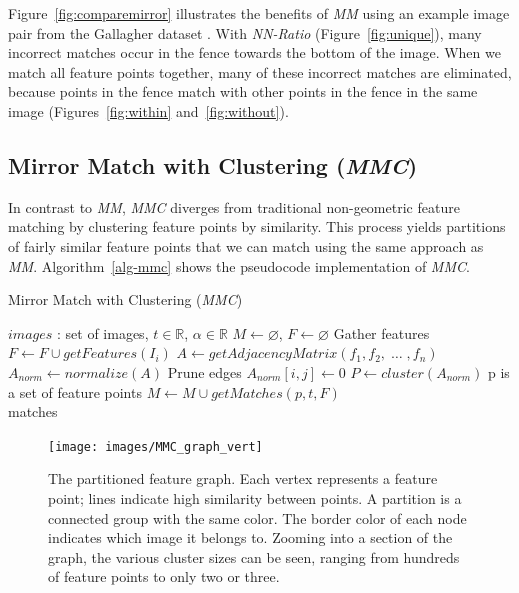 \documentclass[conference]{IEEEtran}
\begin{document}
Figure~\ref{fig:comparemirror} illustrates the benefits of \emph{MM} 
using an example image pair from the Gallagher dataset 
\cite{gallagher2008}.
With \emph{NN-Ratio} (Figure~\ref{fig:unique}), many incorrect matches 
occur in the fence towards the bottom of the image.
When we match all feature points together, many of these incorrect 
matches are eliminated, because points in the fence match with other 
points in the fence in the same image (Figures~\ref{fig:within} 
and~\ref{fig:without}).
%
\subsection{Mirror Match with Clustering (\emph{MMC})}
%
In contrast to \emph{MM}, \emph{MMC} diverges from traditional 
non-geometric feature matching by clustering feature points by 
similarity. This process yields partitions of fairly similar feature 
points that we can match using the same approach as \emph{MM}.  
Algorithm~\ref{alg-mmc} shows the pseudocode implementation of \emph{MMC}.
%
\begin{algorithm}[htb]
\caption{Mirror Match with Clustering (\emph{MMC})}
\label{alg-mmc}
\begin{algorithmic}
\Require $images$ : set of images, $t \in \mathbb{R}$, $\alpha \in 
\mathbb{R}$
\State $M\gets \varnothing$, $F\gets \varnothing$
 \Comment Gather features
    \State $F\gets F \cup getFeatures(I_i)$
\EndFor
\State $A\gets getAdjacencyMatrix(f_1, f_2,\; \ldots \;, f_n)$
\State $A_{norm}\gets normalize(A)$
 \Comment Prune edges
        \State $A_{norm}[i,j] \gets 0$
    \EndIf
\EndFor
\State $P\gets cluster(A_{norm})$
 \Comment p is a set of feature points
    \State $M\gets M \cup getMatches(p, t, F)$
\EndFor \\
\Return matches
\end{algorithmic}
\end{algorithm}
%
\begin{figure}[h]
	\centering
    \texttt{[image: images/MMC\_graph\_vert]}
    \caption{The partitioned feature graph. Each vertex represents a 
        feature point; lines indicate high similarity between points. A 
        partition is a connected group with the same color. The border 
        color of each node indicates which image it belongs to.  Zooming 
    into a section of the graph, the various cluster sizes can be seen, 
ranging from hundreds of feature points to only two or three.}
	\label{fig:graph}
\end{figure}
\end{document}

